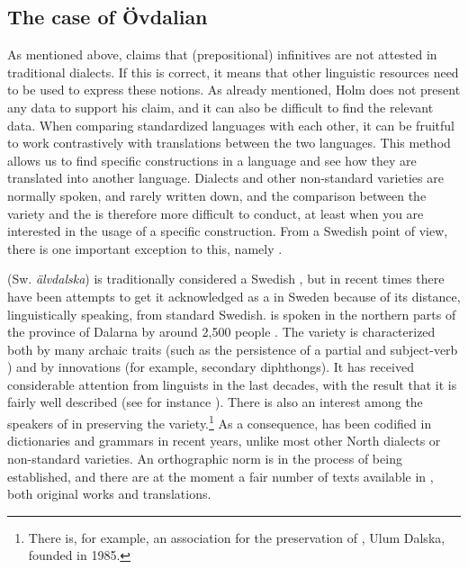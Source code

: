 \documentclass[output=paper]{langscibook}
\begin{document}
\subsection{The case of Övdalian}\label{sec:kalm:4.3}


As mentioned above, \citet[27]{Holm1967} claims that  (prepositional) infinitives are not attested in traditional dialects. If this is correct, it means that other linguistic resources need to be used to express these  notions. As already mentioned, Holm does not present any data to support his claim, and it can also be difficult to find the relevant data. When comparing standardized languages with each other, it can be fruitful to work contrastively with translations between the two languages. This method allows us to find specific constructions in a language and see how they are translated into another language. Dialects and other non-standard varieties are normally spoken, and rarely written down, and the comparison between the variety and the  is therefore more difficult to conduct, at least when you are interested in the usage of a specific construction. From a Swedish point of view, there is one important exception to this, namely . 

 (Sw. \textit{älvdalska}) is traditionally considered a Swedish , but in recent times there have been attempts to get it acknowledged as a  in Sweden because of its distance, linguistically speaking, from standard Swedish.  is spoken in the northern parts of the province of Dalarna by around 2,500 people \citep[27]{Garbacz2009}. The variety is characterized both by many archaic traits (such as the persistence of a partial  and subject-verb ) and by innovations (for example, secondary diphthongs). It has received considerable attention from linguists in the last decades, with the result that it is fairly well described (see for instance \citealt{Garbacz2009,BentzenEtAl2015}). There is also an interest among the speakers of  in preserving the variety.\footnote{There is, for example, an association for the preservation of , Ulum Dalska, founded in 1985.} As a consequence,  has been codified in dictionaries and grammars in recent years, unlike most other North  dialects or non-standard varieties. An orthographic norm is in the process of being established, and there are at the moment a fair number of texts available in , both original works and translations. 
\end{document}
